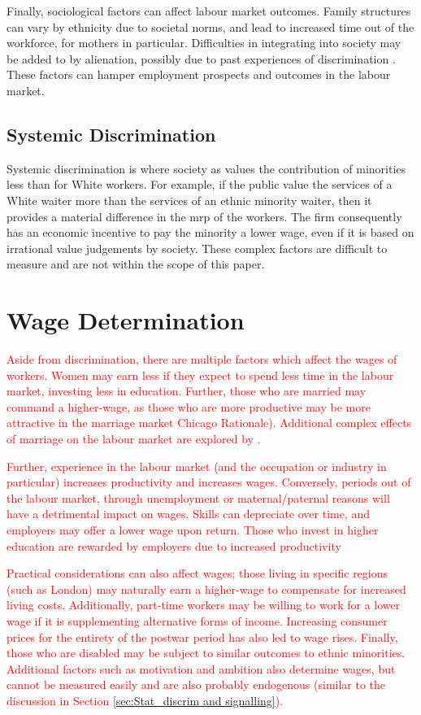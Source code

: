 \documentclass[class=article, crop=false]{standalone}
\begin{document}
Finally, sociological factors can affect labour market outcomes. Family structures can vary by ethnicity due to societal norms, and lead to increased time out of the workforce, for mothers in particular. Difficulties in integrating into society may be added to by alienation, possibly due to past experiences of discrimination \citep{Berthoud}. These factors can hamper employment prospects and outcomes in the labour market.

\subsection{Systemic Discrimination}
\label{sec:systemic_discrim}
Systemic discrimination is where society as values the contribution of minorities less than for White workers. For example, if the public value the services of a White waiter more than the services of an ethnic minority waiter, then it provides a material difference in the \acrfull{mrp} of the workers. The firm consequently has an economic incentive to pay the minority a lower wage, even if it is based on irrational value judgements by society. These complex factors are difficult to measure and are not within the scope of this paper.

\section{Wage Determination}
\textcolor{red}{ %
Aside from discrimination, there are multiple factors which affect the wages of workers. Women may earn less if they expect to spend less time in the labour market, investing less in education. Further, those who are married may command a higher-wage, as those who are more productive may be more attractive in the marriage market \textcolor{red}{Chicago Rationale}). Additional complex effects of marriage on the labour market are explored by \citep{Ahituv}. 

Further, experience in the labour market (and the occupation or industry in particular) increases productivity and increases wages. Conversely, periods out of the labour market, through unemployment or maternal/paternal reasons will have a detrimental impact on wages. Skills can depreciate over time, and employers may offer a lower wage upon return. Those who invest in higher education are rewarded by employers due to increased productivity \citep{Becker}

Practical considerations can also affect wages; those living in specific regions (such as London) may naturally earn a higher-wage to compensate for increased living costs. Additionally, part-time workers may be willing to work for a lower wage if it is supplementing alternative forms of income. Increasing consumer prices for the entirety of the postwar period \citep{WorldBank} has also led to wage rises. Finally, those who are disabled may be subject to similar outcomes to ethnic minorities. Additional factors such as motivation and ambition also determine wages, but cannot be measured easily and are also probably endogenous (similar to the discussion in Section \ref{sec:Stat_discrim and signalling}). 
}

\ifstandalone

\fi
\end{document}
